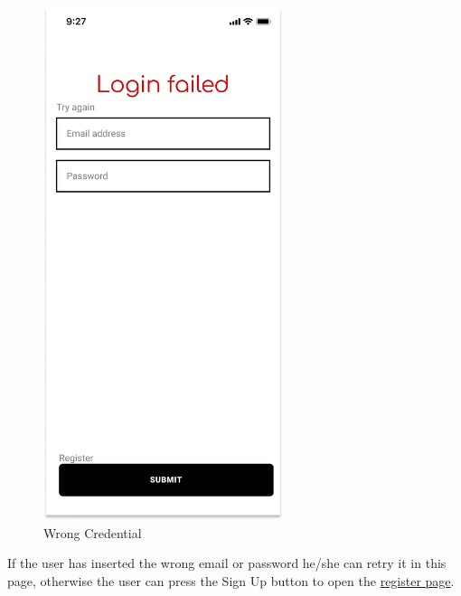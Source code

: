 \begin{figure}[H]
    \centering
    \includegraphics[keepaspectratio, height=15cm]{Mockup/UserAppInterface/Failed Login.png}
    \caption{Wrong Credential}
    \label{fig:FailedLogin}
\end{figure}
If the user has inserted the wrong email or password he/she can retry it in this page, otherwise the user can press the Sign Up button to open the \hyperref[fig:Register]{register page}.


